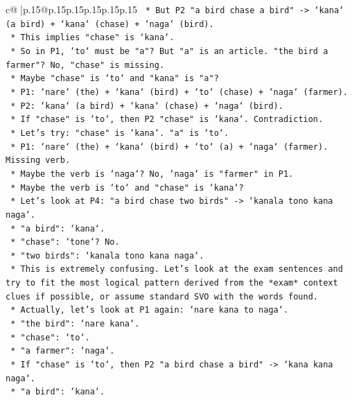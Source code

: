 \documentclass{article}
\begin{document}
{\begin{supertabular}{c@{$\;$}|p{.15\linewidth}@{}p{.15\linewidth}p{.15\linewidth}p{.15\linewidth}p{.15\linewidth}p{.15\linewidth}}
{{{\texttt{        *   But P2 "a bird chase a bird" {-}> `kana` (a bird) + `kana` (chase) + `naga` (bird).} \\
\texttt{        *   This implies "chase" is `kana`.} \\
\texttt{        *   So in P1, `to` must be "a"? But "a" is an article. "the bird a farmer"? No, "chase" is missing.} \\
\texttt{        *   Maybe "chase" is `to` and "kana" is "a"?} \\
\texttt{        *   P1: `nare` (the) + `kana` (bird) + `to` (chase) + `naga` (farmer).} \\
\texttt{        *   P2: `kana` (a bird) + `kana` (chase) + `naga` (bird).} \\
\texttt{        *   If "chase" is `to`, then P2 "chase" is `kana`. Contradiction.} \\
\texttt{        *   Let's try: "chase" is `kana`. "a" is `to`.} \\
\texttt{        *   P1: `nare` (the) + `kana` (bird) + `to` (a) + `naga` (farmer). Missing verb.} \\
\texttt{        *   Maybe the verb is `naga`? No, `naga` is "farmer" in P1.} \\
\texttt{        *   Maybe the verb is `to` and "chase" is `kana`?} \\
\texttt{        *   Let's look at P4: "a bird chase two birds" {-}> `kanala tono kana naga`.} \\
\texttt{            *   "a bird": `kana`.} \\
\texttt{            *   "chase": `tone`? No.} \\
\texttt{            *   "two birds": `kanala tono kana naga`.} \\
\texttt{            *   This is extremely confusing. Let's look at the exam sentences and try to fit the most logical pattern derived from the *exam* context clues if possible, or assume standard SVO with the words found.} \\
\texttt{            *   Actually, let's look at P1 again: `nare kana to naga`.} \\
\texttt{                *   "the bird": `nare kana`.} \\
\texttt{                *   "chase": `to`.} \\
\texttt{                *   "a farmer": `naga`.} \\
\texttt{                *   If "chase" is `to`, then P2 "a bird chase a bird" {-}> `kana kana naga`.} \\
\texttt{                    *   "a bird": `kana`.} \\
}}}
\end{supertabular}}
\end{document}
